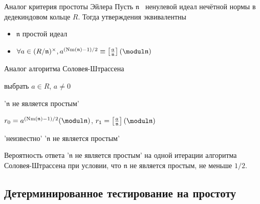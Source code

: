 \documentclass[8pt, xcolor=x11names]{beamer}
\begin{document}
\begin{frame}
    \begin{block}{Аналог критерия простоты Эйлера}
        Пусть $\mathfrak{n}$ \textendash\ ненулевой идеал нечётной нормы в дедекиндовом кольце $R$.
    	Тогда утверждения эквивалентны
    	\begin{itemize}
    	    \item $\mathfrak{n}$ простой идеал
    	    
    	    \item $\forall a\in(R/\mathfrak{n})^{\times}, a^{(\textrm{Nm}(\mathfrak{n})-1)/2}\equiv \left[\frac{a}{\mathfrak{n}}\right](\modul \mathfrak{n})$
    	\end{itemize}
    \end{block}

    \begin{block}{Аналог алгоритма Соловея-Штрассена}
        \begin{algorithmic}[1]
            \State выбрать $a \in R$, $a \neq 0$

                \State\Return '$\mathfrak{n}$ не является простым'
            \EndIf

            \State $r_0 = a^{(\textrm{Nm}(\mathfrak{n}) - 1) / 2}(\modul \mathfrak{n})$, $r_1 = \left[\frac{a}{\mathfrak{n}}\right](\modul \mathfrak{n})$
    		
    		    \State\Return 'неизвестно'
    		\Else
    		    \State\Return '$\mathfrak{n}$ не является простым'
    		\EndIf
        \end{algorithmic}
    \end{block}
    
    \begin{block_notitle}{}
        Вероятность ответа '$\mathfrak{n}$ не является простым' на одной итерации алгоритма Соловея-Штрассена при условии, что $\mathfrak{n}$ не является простым, не меньше $1/2$.
    \end{block_notitle}
\end{frame}

\subsection{Детерминированное тестирование на простоту}
\end{document}
